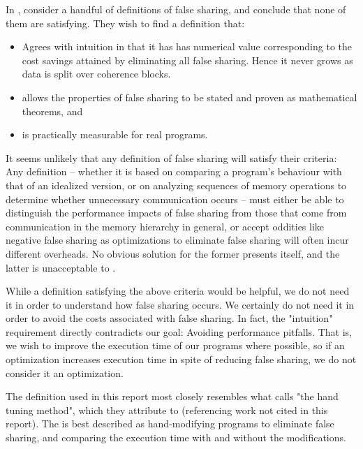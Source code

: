 In \citeyear{falsedef}, \citeauthor{falsedef} \cite{falsedef} consider a handful
of definitions of false sharing, and conclude that none of them are satisfying.
They wish to find a definition that:

\begin{itemize}
	\item Agrees with intuition in that it has has numerical value
		corresponding to the cost savings attained by eliminating all
		false sharing. Hence it never grows as data is split over
		coherence blocks.
	\item allows the properties of false sharing to be stated and proven as
		mathematical theorems, and
	\item is practically measurable for real programs.
\end{itemize}

It seems unlikely that any definition of false sharing will satisfy their
criteria: Any definition -- whether it is based on comparing a program's
behaviour with that of an idealized version\footnotemark, or on analyzing
sequences of memory operations to determine whether unnecessary communication
occurs -- must either be able to distinguish the performance impacts of false
sharing from those that come from communication in the memory hierarchy in
general, or accept oddities like negative false sharing as optimizations to
eliminate false sharing will often incur different overheads.  No obvious
solution for the former presents itself, and the latter is unacceptable to
\citeauthor{falsedef}.

While a definition satisfying the above criteria would be helpful, we do not
need it in order to understand how false sharing occurs. We certainly
do not need it in order to avoid the costs associated with false sharing. In
fact, the "intuition" requirement directly contradicts our goal: Avoiding
performance pitfalls. That is, we wish to improve the execution time of our
programs where possible, so if an optimization increases execution time in spite
of reducing false sharing, we do not consider it an optimization.

The definition used in this report most closely resembles what
\citeauthor{falsedef} calls "the hand tuning method", which they attribute to
\citeauthor{eggersReducing} (referencing work not cited in this report). The
is best described as hand-modifying programs to eliminate false sharing, and
comparing the execution time with and without the modifications.



